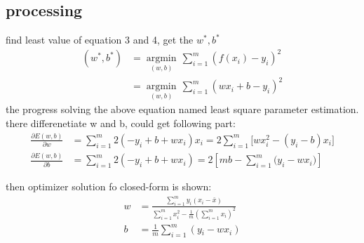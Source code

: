 \documentclass[12pt]{ctexart}%
\begin{document}
	\subsection{\quad processing}
	find least value of equation 3 and 4, get the $w^*,b^*$ 
	\begin{align}
	({{w}^{*}},{{b}^{*}}) & =\underset{(w,b)}{\mathop{\arg \min }}\,\sum\limits_{i=1}^{m}{{{(f({{x}_{i}})-{{y}_{i}})}^{2}}} \\ 
	& =\underset{(w,b)}{\mathop{\arg \min }}\,\sum\limits_{i=1}^{m}{{{(w{{x}_{i}}+b-{{y}_{i}})}^{2}}} 
	\end{align}
	the progress solving the above equation named least square parameter estimation. there differenetiate w and b, could get following part:
	\begin{align}
	\frac{\partial E(w,b)}{\partial w}&=\sum\limits_{i=1}^{m}{2(-{{y}_{i}}+b+w{{x}_{i}}){{x}_{i}}}=2\sum\limits_{i=1}^{m}{[wx_{i}^{2}-({{y}_{i}}-b)}{{x}_{i}}]\\
	\frac{\partial E(w,b)}{\partial b}&=\sum\limits_{i=1}^{m}{2(-{{y}_{i}}+b+w{{x}_{i}})}=2[mb-\sum\limits_{i=1}^{m}{({{y}_{i}}-w{{x}_{i}}})]
	\end{align}

	then optimizer solution fo closed-form is shown:
	\begin{align}
	w&=\frac{\sum\limits_{i=1}^{m}{{{y}_{i}}({{x}_{i}}-\bar{x})}}{\sum\limits_{i=1}^{m}{x_{i}^{2}-\frac{1}{m}{{(\sum\limits_{i=1}^{m}{{{x}_{i}}})}^{2}}}}\\
	b&=\frac{1}{m}\sum\limits_{i=1}^{m}{(y{}_{i}-w{{x}_{i}})}
	\end{align}
\end{document}
